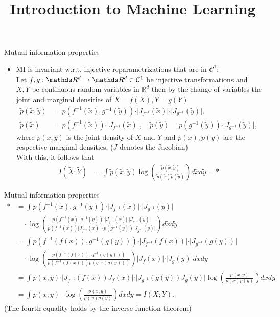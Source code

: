 \documentclass[11pt,compress,t,notes=noshow, xcolor=table]{beamer}
\title{Introduction to Machine Learning}
\date{}
\begin{document}


\begin{vbframe} {Mutual information properties}
\begin{itemize}
    \item MI is invariant w.r.t. injective reparametrizations that are in $\mathcal{C}^1:$\\
    \medskip
    Let $f, g: \R^d\rightarrow\R^d \in \mathcal{C}^1$ be injective transformations and $X, Y$ be continuous random variables in $\mathbb{R}^d$ then by the change of variables the joint and marginal densities of  $\tilde{X} = f(X), \tilde{Y} = g(Y)$
    \begin{align*}
        \tilde{p}(\tilde{x}, \tilde{y}) &= p(f^{-1}(\tilde{x}), g^{-1}(\tilde{y}))\cdot\vert J_{f^{-1}}(\tilde{x})\vert\cdot\vert J_{g^{-1}}(\tilde{y})\vert, \\
        \tilde{p}(\tilde{x}) &= p(f^{-1}(\tilde{x}))\cdot\vert J_{f^{-1}}(\tilde{x})\vert,\quad \tilde{p}(\tilde{y}) = p(g^{-1}(\tilde{y}))\cdot\vert J_{g^{-1}}(\tilde{y})\vert, 
    \end{align*}
    where $p(x, y)$ is the joint density of $X$ and $Y$ and $p(x), p(y)$ are the respective marginal densities. ($J$ denotes the Jacobian) \\
    \medskip
    With this, it follows that 
    \begin{align*}
      I(\tilde{X}; \tilde{Y}) &= \int \tilde{p}(\tilde{x}, \tilde{y}) \log\left(\frac{\tilde{p}(\tilde{x}, \tilde{y})}{\tilde{p}(\tilde{x})\tilde{p}(\tilde{y})}\right)d\tilde{x}d\tilde{y}  = *
    \end{align*}
\end{itemize}
\end{vbframe}
\begin{vbframe}{Mutual information properties}
\begin{align*}
* & = \int p(f^{-1}(\tilde{x}), g^{-1}(\tilde{y}))\cdot\vert J_{f^{-1}}(\tilde{x})\vert\cdot\vert J_{g^{-1}}(\tilde{y})\vert \\ &\quad\cdot \log\left(\frac{ p(f^{-1}(\tilde{x}), g^{-1}(\tilde{y}))\cdot\vert J_{f^{-1}}(\tilde{x})\vert\cdot\vert J_{g^{-1}}(\tilde{y})\vert }{p(f^{-1}(\tilde{x}))\vert J_{f^{-1}}(\tilde{x})\vert \cdot p(g^{-1}(\tilde{y}))\vert J_{g^{-1}}(\tilde{y})\vert}\right)d\tilde{x}d\tilde{y}
\\&= \int p(f^{-1}(f(x)), g^{-1}(g(y)))\cdot\vert J_{f^{-1}}(f(x))\vert\cdot\vert J_{g^{-1}}(g(y))\vert \\ &\quad\cdot \log\left(\frac{p(f^{-1}(f(x)), g^{-1}(g(y)))}{p(f^{-1}(f(x)))p(g^{-1}(g(y)))}\right)\vert J_f(x)\vert\cdot\vert J_g(y)\vert dxdy \\
    &=   \int p(x, y)\cdot\vert J_{f^{-1}}(f(x))J_f(x)\vert\cdot\vert J_{g^{-1}}(g(y))J_g(y)\vert  \log\left(\frac{p(x, y)}{p(x)p(y)}\right)dxdy \\
        &=   \int p(x, y)\cdot \log\left(\frac{p(x, y)}{p(x)p(y)}\right)dxdy = I(X; Y).
\end{align*}
(The fourth equality holds by the inverse function theorem)
\end{vbframe}


\endlecture
\end{document}
